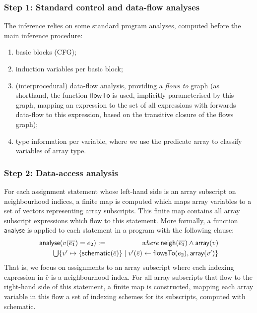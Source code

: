 \documentclass[9pt]{sigplanconf}
\newcounter{block}
\theoremstyle{definition}
\newcommand{\neigh}{\textsf{neigh}}
\newcommand{\arrayTy}{\textsf{array}}
\begin{document}
\subsubsection{Step 1: Standard control and data-flow analyses}
\label{sec:inf-step1}

The inference relies on some standard program analyses, computed
before the main inference procedure:
%
\begin{enumerate}
\item basic blocks (CFG);
\item induction variables per basic block;
\item (interprocedural) data-flow analysis, providing a \emph{flows to}
  graph (as shorthand, the function
  $\mathsf{flowTo}$ is used, implicitly parameterised by this graph,
  mapping an expression to the set of all expressions
  with forwards data-flow to this expression, based on the transitive
  closure of the flows graph);
\item type information per variable, where we use the predicate
\arrayTy{} to classify variables of array type.
\end{enumerate}
%

\subsubsection{Step 2: Data-access analysis}
\label{sec:inf-step2}

For each assignment statement whose left-hand side is an array
subscript on neighbourhood indices, a finite map is computed which
maps array variables to a set of vectors representing array
subscripts.  This finite map contains all array subscript expressions
which flow to this statement. More formally, a function
$\textsf{analyse}$ is applied to each statement in a program with the
following clause:
%
\begin{align*}
\begin{array}{lr}
\textsf{analyse}(v(\overline{e_1}) = e_2)
 := \qquad\qquad & \textit{where} \; \neigh(\overline{e_1}) \wedge \arrayTy(v)  \\[0.3em]
\multicolumn{2}{l}{\qquad \bigcup\{v' \mapsto \{\textsf{schematic}(\bar{e})\} \mid v'(\bar{e}) \leftarrow \mathsf{flowsTo}(e_2),
  \arrayTy(v')\}}
\end{array}
\end{align*}
%
That is, we focus on assignments to an array subscript where each
indexing expression in $\bar{e}$ is a neighbourhood index.  For
all array subscripts that flow to the right-hand side of this
statement, a finite map is constructed, mapping each array variable
in this flow a set of indexing schemes for its subscripts, computed
with \textsf{schematic}.
\end{document}
